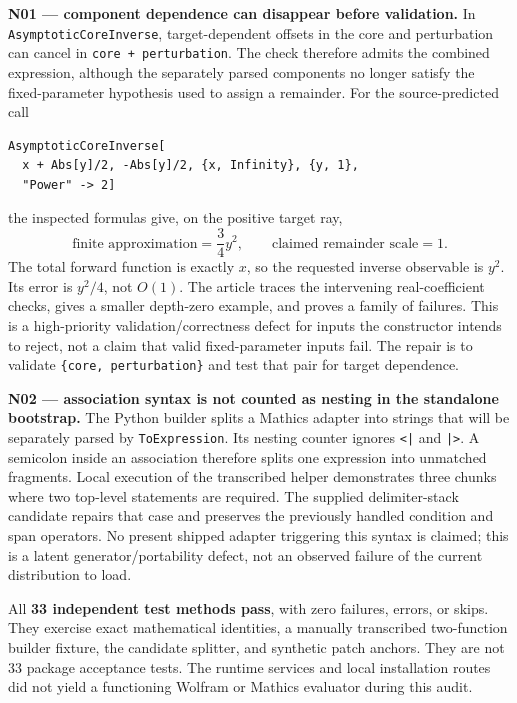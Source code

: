 \documentclass[11pt,letterpaper]{article}
\newcommand{\code}[1]{\nolinkurl{#1}}
\begin{document}
\textbf{N01 --- component dependence can disappear before validation.} In \code{AsymptoticCoreInverse}, target-dependent offsets in the core and perturbation can cancel in \code{core + perturbation}. The check therefore admits the combined expression, although the separately parsed components no longer satisfy the fixed-parameter hypothesis used to assign a remainder. For the source-predicted call
\begin{lstlisting}
AsymptoticCoreInverse[
  x + Abs[y]/2, -Abs[y]/2, {x, Infinity}, {y, 1},
  "Power" -> 2]
\end{lstlisting}
the inspected formulas give, on the positive target ray,
\[
 \text{finite approximation}=\frac34y^2,
 \qquad \text{claimed remainder scale}=1.
\]
The total forward function is exactly \(x\), so the requested inverse observable is \(y^2\). Its error is \(y^2/4\), not \(O(1)\). The article traces the intervening real-coefficient checks, gives a smaller depth-zero example, and proves a family of failures. This is a high-priority validation/correctness defect for inputs the constructor intends to reject, not a claim that valid fixed-parameter inputs fail. The repair is to validate \texttt{\{core, perturbation\}} and test that pair for target dependence.\cite{core,coefficients}

\textbf{N02 --- association syntax is not counted as nesting in the standalone bootstrap.} The Python builder splits a Mathics adapter into strings that will be separately parsed by \code{ToExpression}. Its nesting counter ignores \code{<|} and \code{|>}. A semicolon inside an association therefore splits one expression into unmatched fragments. Local execution of the transcribed helper demonstrates three chunks where two top-level statements are required. The supplied delimiter-stack candidate repairs that case and preserves the previously handled condition and span operators. No present shipped adapter triggering this syntax is claimed; this is a latent generator/portability defect, not an observed failure of the current distribution to load.\cite{builder,buildertests,mathicsparser}

All \textbf{33 independent test methods pass}, with zero failures, errors, or skips. They exercise exact mathematical identities, a manually transcribed two-function builder fixture, the candidate splitter, and synthetic patch anchors. They are not 33 package acceptance tests. The runtime services and local installation routes did not yield a functioning Wolfram or Mathics evaluator during this audit.
\end{document}
